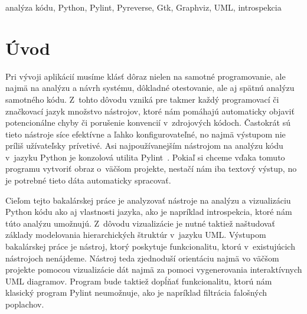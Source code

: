 \documentclass[11pt,oneside,final]{fithesis2}
\begin{document}
 \FrontMatter  
 \ThesisTitlePage

\begin{ThesisDeclaration}
\DeclarationText
\AdvisorName
\end{ThesisDeclaration}

\begin{ThesisThanks}
\end{ThesisThanks}

\begin{ThesisAbstract}
\end{ThesisAbstract}

\begin{ThesisKeyWords}
analýza kódu, Python, Pylint, Pyreverse, Gtk, Graphviz, UML, introspekcia
\end{ThesisKeyWords}



\MainMatter  
\tableofcontents

\chapter{Úvod}

	Pri vývoji aplikácií musíme klásť dôraz nielen na samotné programovanie, ale najmä na analýzu a návrh systému, dôkladné otestovanie, ale aj spätnú analýzu samotného kódu. Z~tohto dôvodu vzniká pre takmer každý programovací či značkovací jazyk množstvo nástrojov, ktoré nám pomáhajú automaticky objaviť potencionálne chyby či porušenie konvencií v~zdrojových kódoch. Častokrát sú tieto nástroje síce efektívne a ľahko konfigurovateľné, no najmä výstupom nie príliš užívateľsky prívetivé. Asi najpoužívanejším nástrojom na analýzu kódu v~jazyku Python je konzolová utilita Pylint~\cite{pylint}. Pokiaľ si chceme vďaka tomuto programu vytvoriť obraz o~väčšom projekte, nestačí nám iba textový výstup, no je potrebné tieto dáta automaticky spracovať.
	
	Cieľom tejto bakalárskej práce je analyzovať nástroje na analýzu a vizualizáciu Python kódu ako aj vlastnosti jazyka, ako je napríklad introspekcia, ktoré nám túto analýzu umožnujú. Z~dôvodu vizualizácie je nutné taktiež naštudovať základy modelovania hierarchických štruktúr v~jazyku UML. Výstupom bakalárskej práce je nástroj, ktorý poskytuje funkcionalitu, ktorú v~existujúcich nástrojoch nenájdeme. Nástroj teda zjednoduší orientáciu najmä vo väčšom projekte pomocou vizualizácie dát najmä za pomoci vygenerovania interaktívnych UML diagramov. Program bude taktiež dopĺňať funkcionalitu, ktorú nám klasický program Pylint neumožnuje, ako je napríklad filtrácia falošných poplachov. 
\end{document}
